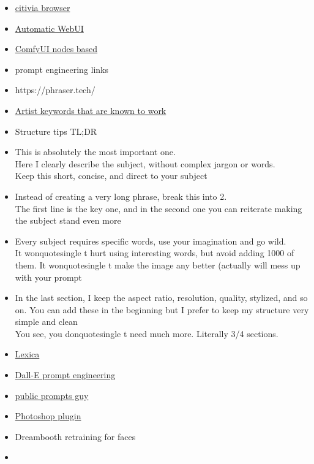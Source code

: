 \begin{itemize}
{  GUI and user guide}
\item
  \href{https://github.com/Vetchems/sd-civitai-browser}{citivia browser}
\item
  \href{https://github.com/AUTOMATIC1111/stable-diffusion-webui}{Automatic
  WebUI}
\item
  \href{https://github.com/comfyanonymous/ComfyUI}{ComfyUI nodes based}
\item
  prompt engineering links
\item
  https://phraser.tech/
\item
  \href{https://docs.google.com/document/d/1SaQx1uJ9LBRS7c6OsZIaeanJGkUdsUBjk9X4dC59BaA/edit\#}{Artist
  keywords that are known to work}
\item
  Structure tips TL;DR
\item
  This is absolutely the most important one.\\
  Here I clearly describe the subject, without complex jargon or
  words.\\
  Keep this short, concise, and direct to your subject
\item
  Instead of creating a very long phrase, break this into 2.\\
  The first line is the key one, and in the second one you can reiterate
  making the subject stand even more
\item
  Every subject requires specific words, use your imagination and go
  wild.\\
  It wonquotesingle t hurt using interesting words, but avoid
  adding 1000 of them. It wonquotesingle t make the image any
  better (actually will mess up with your prompt
\item
  In the last section, I keep the aspect ratio, resolution, quality,
  stylized, and so on. You can add these in the beginning but I prefer
  to keep my structure very simple and clean\\
  You see, you donquotesingle t need much more. Literally 3/4
  sections.
\item
  \href{https://lexica.art/}{Lexica}
\item
  \href{https://docs.google.com/document/d/11WlzjBT0xRpQhP9tFMtxzd0q6ANIdHPUBkMV-YB043U/edit\#}{Dall-E
  prompt engineering}
\item
  \href{https://publicprompts.art/}{public prompts guy}
\item
  \href{https://christiancantrell.com/\#ai-ml}{Photoshop plugin}
\item
  Dreambooth retraining for faces
\item

\end{itemize}
